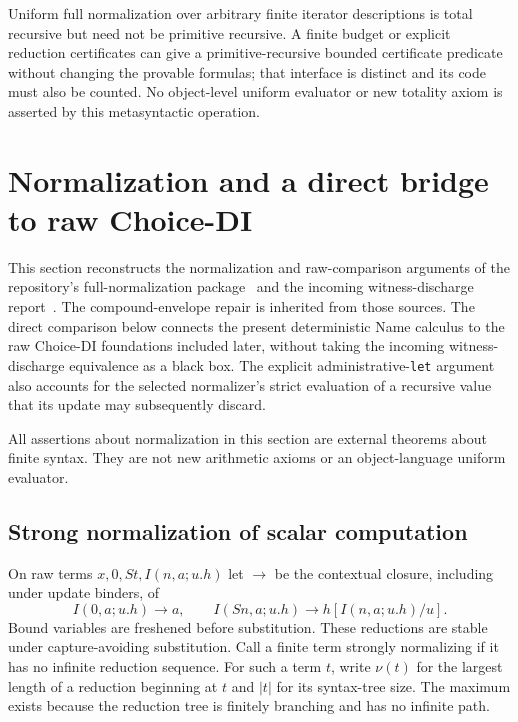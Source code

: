 \documentclass[11pt,a4paper]{article}
\theoremstyle{definition}\newtheorem{definition}[theorem]{Definition}
\theoremstyle{remark}\newtheorem{remark}[theorem]{Remark}
\begin{document}
Uniform full normalization over arbitrary finite iterator descriptions is
total recursive but need not be primitive recursive. A finite budget or
explicit reduction certificates can give a primitive-recursive bounded
certificate predicate without changing the provable formulas; that
interface is distinct and its code must also be counted. No object-level
uniform evaluator or new totality axiom is asserted by this metasyntactic
operation.



\section{Normalization and a direct bridge to raw Choice-DI}
\label{sec:normalization-bridge}
\label{sec:canonical-bridge}

This section reconstructs the normalization and raw-comparison arguments
of the repository's full-normalization package~\cite{normalization} and the
incoming witness-discharge report~\cite{witness}. The
compound-envelope repair is inherited from those sources. The direct
comparison below connects the present deterministic Name calculus to the
raw Choice-DI foundations included later, without taking the incoming
witness-discharge equivalence as a black box. The explicit
administrative-\texttt{let} argument also accounts for the selected
normalizer's strict evaluation of a recursive value that its update may
subsequently discard.

All assertions about normalization in this section are external theorems
about finite syntax. They are not new arithmetic axioms or an
object-language uniform evaluator.

\subsection{Strong normalization of scalar computation}

On raw terms $x,0,St,I(n,a;u.h)$ let $\longrightarrow$ be the contextual
closure, including under update binders, of
\[
 I(0,a;u.h)\longrightarrow a,\qquad
 I(Sn,a;u.h)\longrightarrow h[I(n,a;u.h)/u].
 \tag{Raw computation}\label{eq:nb-reduction}
\]
Bound variables are freshened before substitution. These reductions are
stable under capture-avoiding substitution. Call a finite term strongly
normalizing if it has no infinite reduction sequence. For such a term $t$,
write $\nu(t)$ for the largest length of a reduction beginning at $t$ and
$|t|$ for its syntax-tree size. The maximum exists because the reduction
tree is finitely branching and has no infinite path.
\end{document}
